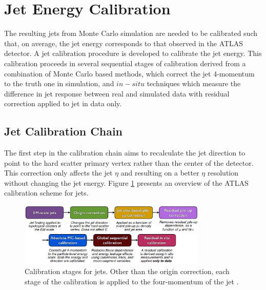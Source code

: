 \section{Jet Energy Calibration}
\label{Jet:Cal}
The resulting jets from Monte Carlo simulation are needed to be calibrated such that, on average, the jet energy corresponds to that observed in the ATLAS detector. A jet calibration procedure is developed to calibrate the jet energy. This calibration proceeds in several sequential stages of calibration derived from a combination of Monte Carlo based methods, which correct the jet 4-momentum to the truth one in simulation, and $in-situ$ techniques which measure the difference in jet response between real and simulated data with residual correction applied to jet in data only.
\subsection{Jet Calibration Chain}
\label{Jet:Cal:chain}
 The first step in the calibration chain aims to recalculate the jet direction to point to the hard scatter primary vertex rather than the center of the detector. This correction only affects the jet $\eta$ and resulting on a better $\eta$ resolution without changing the jet energy. Figure \ref{fig:Jet:Cal:chain} presents an overview of the  ATLAS calibration scheme for jets.
\begin{figure}[htbp]
     \centering
     \includegraphics[width=0.8\textwidth]{Ch4/Img/calibration_chain.png}
     \caption{Calibration stages for jets. Other than the origin correction, each stage of the calibration is applied to the four-momentum of the jet \cite{JES_Sys_13_TeV}.}
     \label{fig:Jet:Cal:chain}
 \end{figure}
